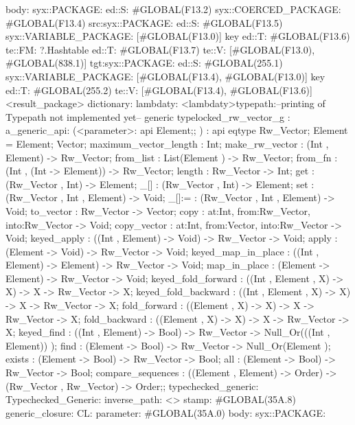 body: syx::PACKAGE:
        ed::S: #GLOBAL(F13.2)
            syx::COERCED_PACKAGE:
                #GLOBAL(F13.4)
                 src:syx::PACKAGE:
                        ed::S: #GLOBAL(F13.5) syx::VARIABLE_PACKAGE: [#GLOBAL(F13.0)] key
                        ed::T: #GLOBAL(F13.6) te::FM: ?.Hashtable
                    ed::T: #GLOBAL(F13.7)
                     te::V:
                     [#GLOBAL(F13.0), #GLOBAL(838.1)]
                tgt:syx::PACKAGE:
                    ed::S: #GLOBAL(255.1)
                     syx::VARIABLE_PACKAGE:
                     [#GLOBAL(F13.4), #GLOBAL(F13.0)]
                     key
                    ed::T: #GLOBAL(255.2)
                     te::V:
                     [#GLOBAL(F13.4), #GLOBAL(F13.6)]
         <result_package>
dictionary:
lambdaty:
  <lambdaty>typepath:--printing of Typepath not implemented yet--
generic typelocked_rw_vector_g
:
a_generic_api:
(<parameter>:
api {
    Element;};
)
:
api {
    eqtype Rw_Vector;
    Element  = Element;
    Vector;
    maximum_vector_length : Int;
    make_rw_vector : (Int , Element) -> Rw_Vector;
    from_list : List(Element ) -> Rw_Vector;
    from_fn : (Int , (Int -> Element)) -> Rw_Vector;
    length : Rw_Vector -> Int;
    get : (Rw_Vector , Int) -> Element;
    _[] : (Rw_Vector , Int) -> Element;
    set : (Rw_Vector , Int , Element) -> Void;
    _[]:= : (Rw_Vector , Int , Element) -> Void;
    to_vector : Rw_Vector -> Vector;
    copy : {at:Int, from:Rw_Vector, into:Rw_Vector} -> Void;
    copy_vector : {at:Int, from:Vector, into:Rw_Vector} -> Void;
    keyed_apply : ((Int , Element) -> Void) -> Rw_Vector -> Void;
    apply : (Element -> Void) -> Rw_Vector -> Void;
    keyed_map_in_place : ((Int , Element) -> Element) -> Rw_Vector -> Void;
    map_in_place : (Element -> Element) -> Rw_Vector -> Void;
    keyed_fold_forward : ((Int , Element , X) -> X) -> X -> Rw_Vector -> X;
    keyed_fold_backward : ((Int , Element , X) -> X) -> X -> Rw_Vector -> X;
    fold_forward : ((Element , X) -> X) -> X -> Rw_Vector -> X;
    fold_backward : ((Element , X) -> X) -> X -> Rw_Vector -> X;
    keyed_find : ((Int , Element) -> Bool) -> Rw_Vector -> Null_Or(((Int , Element)) );
    find : (Element -> Bool) -> Rw_Vector -> Null_Or(Element );
    exists : (Element -> Bool) -> Rw_Vector -> Bool;
    all : (Element -> Bool) -> Rw_Vector -> Bool;
    compare_sequences : ((Element , Element) -> Order) -> (Rw_Vector , Rw_Vector) -> Order;};
typechecked_generic:
Typechecked_Generic:
inverse_path: <>
stamp: #GLOBAL(35A.8)
generic_closure:
CL:
parameter: #GLOBAL(35A.0)
body: syx::PACKAGE:
